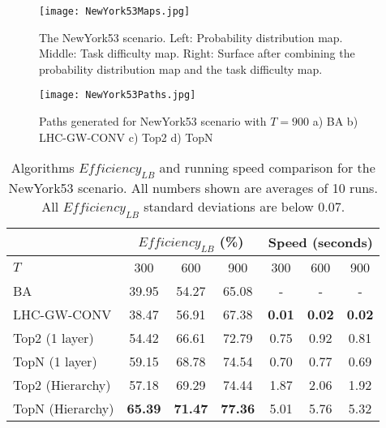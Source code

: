 \documentclass[journal]{IEEEtran}
\begin{document}
\begin{figure}[!ht]
\centering
\texttt{[image: NewYork53Maps.jpg]}
\caption{The NewYork53 scenario. Left: Probability distribution map. Middle: Task difficulty map. Right: Surface after combining the probability distribution map and the task difficulty map.}
\label{NewYork53Maps}
\end{figure}
\begin{figure}[!ht]
\centering
\texttt{[image: NewYork53Paths.jpg]}
\caption{Paths generated for NewYork53 scenario with $T=900$ a) BA b) LHC-GW-CONV c) Top2 d) TopN}
\label{NewYork53Paths}
\end{figure}
\begin{table}[!ht]
\caption{Algorithms $\mathit{Efficiency_{LB}}$ and running speed comparison for the NewYork53 scenario. All numbers shown are averages of 10 runs. All $\mathit{Efficiency_{LB}}$ standard deviations are below 0.07.}
	\centering
		\begin{tabular}
			{|l|c|c|c|c|c|c|}
			\hline
			 & \multicolumn{3}{|c|}{$\mathit{Efficiency_{LB}}$ (\%)} & \multicolumn{3}{|c|}{Speed (seconds)} \\
			\hline
			$T$ & 300 & 600 & 900	& 300 & 600 & 900 \\
			\hline
			BA & 39.95 & 54.27 & 65.08 & - & - & - \\
			\hline			
			LHC-GW-CONV & 38.47 & 56.91 & 67.38 & \textbf{0.01} & \textbf{0.02} & \textbf{0.02} \\
			\hline			
			Top2 (1 layer)	& 54.42 & 66.61 & 72.79 & 0.75 & 0.92 & 0.81 \\ 
			\hline
			TopN (1 layer)	& 59.15 & 68.78 & 74.54 & 0.70 & 0.77 & 0.69 \\ 
			\hline
			Top2 (Hierarchy) & 57.18 & 69.29 & 74.44 & 1.87 & 2.06 & 1.92 \\ 
			\hline
			TopN (Hierarchy) & \textbf{65.39} & \textbf{71.47} & \textbf{77.36} & 5.01 & 5.76 & 5.32 \\ 
			\hline			
		\end{tabular}
\label{NewYork53}
\end{table}
\end{document}
